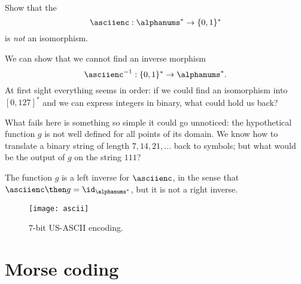 \begin{exercise}
	Show that the \whomo
	\begin{equation*}
		\label{eq:ascii-to-bin}
		\asciienc: \alphanums^* \to \{0,1\}^*
	\end{equation*}
	is \emph{not} an isomorphism.
\end{exercise}
\begin{solution}
	We can show that we cannot find an inverse morphism
	\begin{equation}
		\label{eq:bin-to-ascii}
		\asciienc^{-1}:  \{0,1\}^* \to \alphanums^*.
	\end{equation}
	At first sight everything seems in order: if we could find an isomorphism into $[0,127]^*$ and we can express integers in binary, what could hold us back?

	What fails here is something so simple it could go unnoticed: the hypothetical function $g$ is not well defined for all points of its domain.
	We know how to translate a binary string of length $7,14,21,\dots$ back to symbols; but what would be the output of $g$ on the string $111$?

	The function $g$ is a left inverse for $\asciienc$, in the sense that
	$\asciienc\then g = \id_{\alphanums^*}$, but it is not a right inverse.

\end{solution}

\vfill
\begin{figure}[h]
	\texttt{[image: ascii]}
	\caption{7-bit US-ASCII encoding. \label{fig:asciifigure}}
\end{figure}

\section{Morse coding}

